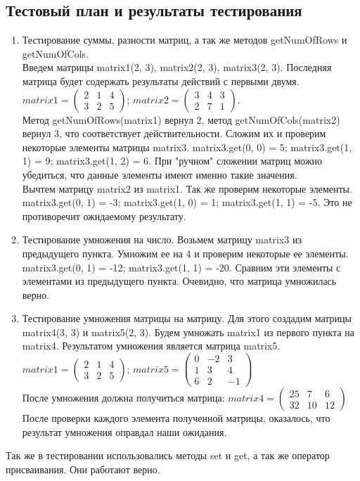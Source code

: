 \documentclass[12pt,a4paper]{report}
\begin{document}
\subsection{Тестовый план и результаты тестирования}
\begin{enumerate}
\item
Тестирование суммы, разности матриц, а так же методов getNumOfRows и getNumOfCols. \\
Введем матрицы matrix1(2, 3), matrix2(2, 3), matrix3(2, 3). Последняя матрица будет содержать результаты действий с первыми двумя. \\
$matrix1 = \begin{pmatrix} 2 & 1 & 4 \\ 3 & 2 & 5 \end{pmatrix}$; 	$matrix2 = \begin{pmatrix} 3 & 4 & 3 \\ 2 & 7 & 1 \end{pmatrix}$.\\
Метод getNumOfRows(matrix1) вернул 2, метод getNumOfCols(matrix2) вернул 3, что соответствует действительности. 
Сложим их и проверим некоторые элементы матрицы matrix3. matrix3.get(0, 0) = 5; matrix3.get(1, 1) = 9; matrix3.get(1, 2) = 6. При "ручном" сложении матриц можно убедиться, что данные элементы имеют именно такие значения. \\
Вычтем матрицу matrix2 из matrix1. Так же проверим некоторые элементы. matrix3.get(0, 1) = -3; matrix3.get(1, 0) = 1; matrix3.get(1, 1) = -5. Это не противоречит ожидаемому результату. \\
\item 
Тестирование умножения на число. Возьмем матрицу matrix3 из предыдущего пункта. Умножим ее на 4 и проверим некоторые ее элементы. matrix3.get(0, 1) = -12; matrix3.get(1, 1) = -20. Сравним эти элементы с элементами из предыдущего пункта. Очевидно, что матрица умножилась верно. 
\item 
Тестирование умножения матрицы на матрицу. Для этого создадим матрицы matrix4(3, 3) и matrix5(2, 3). Будем умножать matrix1 из первого пункта на matrix4. Результатом умножения является матрица matrix5. \\
$matrix1 = \begin{pmatrix} 2 & 1 & 4 \\ 3 & 2 & 5 \end{pmatrix}$; $matrix5 = \begin{pmatrix}
0 & -2 & 3 \\ 1 & 3 & 4 \\ 6 & 2 & -1 \end{pmatrix} $ \\
После умножения должна получиться матрица: $matrix4 = \begin{pmatrix} 25 & 7 & 6 \\ 32 & 10 & 12 \end{pmatrix}$ \\
После проверки каждого элемента полученной матрицы, оказалось, что результат умножения оправдал наши ожидания.
\end{enumerate}
Так же в тестировании использовались методы set и get, а так же оператор присваивания. Они работают верно.
\end{document}
